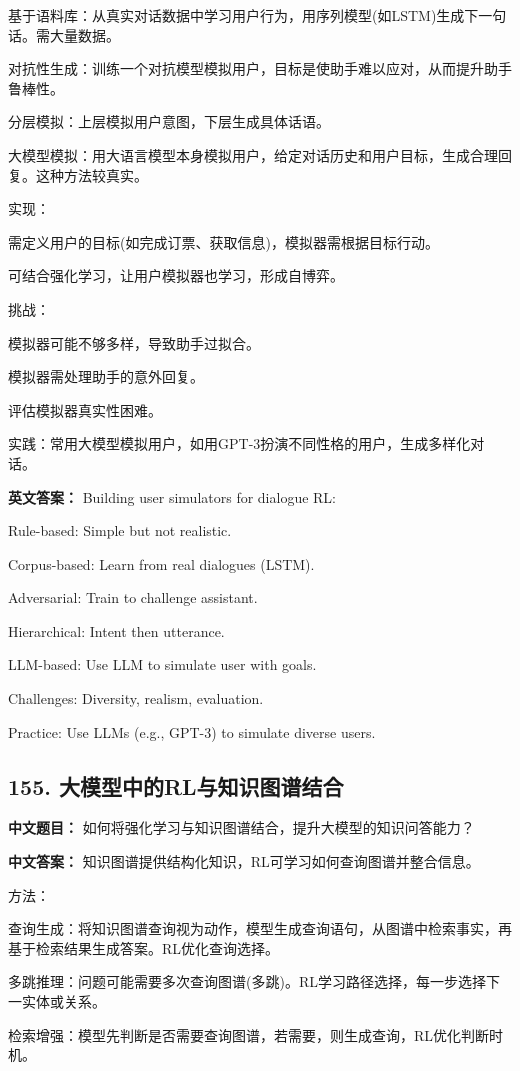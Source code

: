 \documentclass[10pt,a4paper]{ctexart}
\begin{document}
基于语料库：从真实对话数据中学习用户行为，用序列模型(如LSTM)生成下一句话。需大量数据。

对抗性生成：训练一个对抗模型模拟用户，目标是使助手难以应对，从而提升助手鲁棒性。

分层模拟：上层模拟用户意图，下层生成具体话语。

大模型模拟：用大语言模型本身模拟用户，给定对话历史和用户目标，生成合理回复。这种方法较真实。

实现：

需定义用户的目标(如完成订票、获取信息)，模拟器需根据目标行动。

可结合强化学习，让用户模拟器也学习，形成自博弈。

挑战：

模拟器可能不够多样，导致助手过拟合。

模拟器需处理助手的意外回复。

评估模拟器真实性困难。

实践：常用大模型模拟用户，如用GPT-3扮演不同性格的用户，生成多样化对话。

\textbf{英文答案：}
Building user simulators for dialogue RL:

Rule-based: Simple but not realistic.

Corpus-based: Learn from real dialogues (LSTM).

Adversarial: Train to challenge assistant.

Hierarchical: Intent then utterance.

LLM-based: Use LLM to simulate user with goals.

Challenges: Diversity, realism, evaluation.

Practice: Use LLMs (e.g., GPT-3) to simulate diverse users.

\subsection*{155. 大模型中的RL与知识图谱结合}
\textbf{中文题目：} 如何将强化学习与知识图谱结合，提升大模型的知识问答能力？

\textbf{中文答案：}
知识图谱提供结构化知识，RL可学习如何查询图谱并整合信息。

方法：

查询生成：将知识图谱查询视为动作，模型生成查询语句，从图谱中检索事实，再基于检索结果生成答案。RL优化查询选择。

多跳推理：问题可能需要多次查询图谱(多跳)。RL学习路径选择，每一步选择下一实体或关系。

检索增强：模型先判断是否需要查询图谱，若需要，则生成查询，RL优化判断时机。
\end{document}
